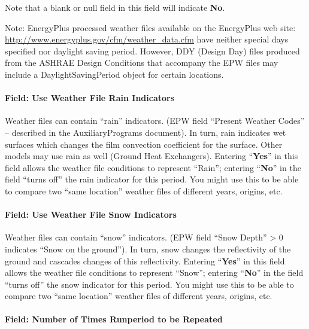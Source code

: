 Note that a blank or null field in this field will indicate \textbf{No}.

\begin{callout}
Note: EnergyPlus processed weather files available on the EnergyPlus web site: \url{http://www.energyplus.gov/cfm/weather\_data.cfm} have neither special days specified nor daylight saving period. However, DDY (Design Day) files produced from the ASHRAE Design Conditions that accompany the EPW files may include a DaylightSavingPeriod object for certain locations.
\end{callout}

\paragraph{Field: Use Weather File Rain Indicators}\label{field-use-weather-file-rain-indicators}

Weather files can contain ``rain'' indicators. (EPW field ``Present Weather Codes'' -- described in the AuxiliaryPrograms document). In turn, rain indicates wet surfaces which changes the film convection coefficient for the surface. Other models may use rain as well (Ground Heat Exchangers). Entering ``\textbf{Yes}'' in this field allows the weather file conditions to represent ``Rain''; entering ``\textbf{No}'' in the field ``turns off'' the rain indicator for this period. You might use this to be able to compare two ``same location'' weather files of different years, origins, etc.

\paragraph{Field: Use Weather File Snow Indicators}\label{field-use-weather-file-snow-indicators}

Weather files can contain ``snow'' indicators. (EPW field ``Snow Depth'' \textgreater{} 0 indicates ``Snow on the ground''). In turn, snow changes the reflectivity of the ground and cascades changes of this reflectivity. Entering ``\textbf{Yes}'' in this field allows the weather file conditions to represent ``Snow''; entering ``\textbf{No}'' in the field ``turns off'' the snow indicator for this period. You might use this to be able to compare two ``same location'' weather files of different years, origins, etc.

\paragraph{Field: Number of Times Runperiod to be Repeated}\label{field-number-of-times-runperiod-to-be-repeated}

